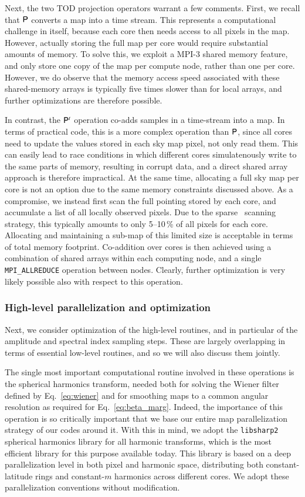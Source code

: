 \documentclass[onecolumn]{aa}
\renewcommand{\P}[0]{\tens{P}}
\begin{document}
Next, the two TOD projection operators warrant a few comments. First,
we recall that $\P$ converts a map into a time stream. This represents
a computational challenge in itself, because each core then needs
access to all pixels in the map. However, actually storing the full
map per core would require substantial amounts of memory. To solve
this, we exploit a MPI-3 shared memory feature, and only store one
copy of the map per compute node, rather than one per core. However,
we do observe that the memory access speed associated with these
shared-memory arrays is typically five times slower than for local
arrays, and further optimizations are therefore possible.

In contrast, the $\P^t$ operation co-adds samples in a time-stream
into a map. In terms of practical code, this is a more complex
operation than $\P$, since all cores need to update the values stored
in each sky map pixel, not only read them. This can easily lead to
race conditions in which different cores simulatenously write to the
same parts of memory, resulting in corrupt data, and a direct shared
array approach is therefore impractical. At the same time, allocating
a full sky map per core is not an option due to the same memory
constraints discussed above. As a compromise, we instead first scan
the full pointing stored by each core, and accumulate a list of all
locally observed pixels. Due to the sparse \Planck\ scanning strategy,
this typically amounts to only 5--10\,\% of all pixels for each
core. Allocating and maintaining a sub-map of this limited size is
acceptable in terms of total memory footprint. Co-addition over cores
is then achieved using a combination of shared arrays within each
computing node, and a single \texttt{MPI\_ALLREDUCE} operation between
nodes. Clearly, further optimization is very likely possible also with
respect to this operation.

\subsubsection{High-level parallelization and optimization}

Next, we consider optimization of the high-level routines, and in
particular of the amplitude and spectral index sampling steps. These
are largely overlapping in terms of essential low-level routines, and
so we will also discuss them jointly.

The single most important computational routine involved in these
operations is the spherical harmonics transform, needed both for
solving the Wiener filter defined by Eq.~\eqref{eq:wiener} and for
smoothing maps to a common angular resolution as required for
Eq.~\eqref{eq:beta_marg}. Indeed, the importance of this operation is so
critically important that we base our entire map parallelization
strategy of our codes around it. With this in mind, we adopt the
\texttt{libsharp2} \citep{reinecke2013} spherical harmonics library
for all harmonic transforms, which is the most efficient library for
this purpose available today. This library is based on a deep
parallelization level in both pixel and harmonic space, distributing
both constant-latitude rings and constant-$m$ harmonics across
different cores. We adopt these parallelization conventions without
modification. 
\end{document}
